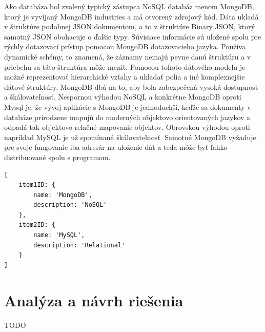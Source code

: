 Ako databáza bol zvolený typický zástupca NoSQL databáz menom MongoDB, ktorý je vyvíjaný MongoDB industries a má otvorený zdrojový kód. Dáta ukladá v štruktúre podobnej JSON dokumentom, a to v štruktúre Binary JSON, ktorý samotný JSON obohacuje o ďalšie typy. Súvisiace informácie sú uložené spolu pre rýchly dotazovací prístup pomocou MongoDB dotazovacieho jazyka. Používa dynamické schémy, to znamená, že záznamy nemajú pevne danú štruktúru a v priebehu sa táto štruktúra môže meniť. Pomocou tohoto dátového modelu je možné reprezentovať hierarchické vzťahy a ukladať polia a iné komplexnejšie dátové štruktúry. MongoDB dbá na to, aby bola zabezpečená vysoká dostupnosť a škálovateľnosť. Nespornou výhodou NoSQL a konkrétne MongoDB oproti Mysql je, že vývoj aplikácie s MongoDB je jednoduchší, keďže sa dokumenty v databáze prirodzene mapujú do moderných objektovo orientovaných jazykov a odpadá tak objektovo relačné mapovanie objektov. Obrovskou výhodou oproti napríklad MySQL je už spomínaná škálovateľnosť. Samotné MongoDB vyžaduje pre svoje fungovanie iba adresár na uloženie dát a teda môže byť ľahko distribuované spolu s programom. \cite{9egOMsyThyK0MyF2}
\begin{lstlisting}[caption={Ukážka štruktúry NoSQL MongoDB databáze.},captionpos=b]
[
    item1ID: {
	    name: 'MongoDB',
	    description: 'NoSQL'
    },
    item2ID: {
	    name: 'MySQL',
	    description: 'Relational'
    }
]
\end{lstlisting}

\chapter{Analýza a návrh riešenia}
TODO
